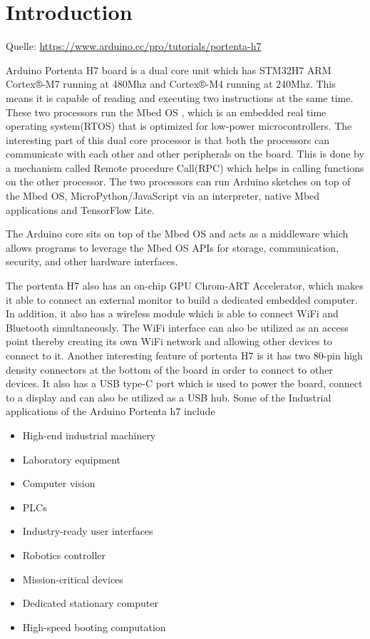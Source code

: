 %
%
%

\chapter{Introduction}

{\tiny Quelle: \url{https://www.arduino.cc/pro/tutorials/portenta-h7}}




Arduino Portenta H7 board is a dual core unit which has STM32H7 ARM Cortex®-M7 running at 480Mhz and Cortex®-M4 running at 240Mhz. This means it is capable of reading and executing two instructions at the same time. These two processors run the Mbed OS , which is an embedded real time operating system(RTOS) that is optimized for low-power microcontrollers. The interesting part of this dual core processor is that both the processors can communicate with each other and other peripherals on the board.  This is done by a mechanism called Remote procedure Call(RPC) which helps in calling functions on the other processor. The two processors can run Arduino sketches on top of the Mbed OS,  MicroPython/JavaScript via an interpreter, native Mbed applications and TensorFlow Lite.

The Arduino core sits on top of the Mbed OS and acts as a middleware which allows programs to leverage the Mbed OS APIs for storage, communication, security, and other hardware interfaces.

The portenta H7 also has an on-chip GPU Chrom-ART Accelerator, which makes it able to connect an external monitor to build a dedicated embedded computer. In addition, it also has a wireless module which is able to connect WiFi and Bluetooth simultaneously. The WiFi interface can also be utilized as an access point thereby creating its own WiFi network and allowing other devices to connect to it.
Another interesting feature of portenta H7 is it has two 80-pin high density connectors at the bottom of the board in order to connect to other devices.  It also has a USB type-C port  which is used to power the board, connect to a display and can also be utilized as a USB hub. 
Some of the Industrial applications of the Arduino Portenta h7 include\cite{PortentaH7:2021}

\begin{itemize}
	
	\item High-end industrial machinery
	\item	Laboratory equipment
	\item	Computer vision
	\item	PLCs
	\item	Industry-ready user interfaces
	\item	Robotics controller
	\item	Mission-critical devices
	\item	Dedicated stationary computer
	\item	High-speed booting computation 
\end{itemize}


